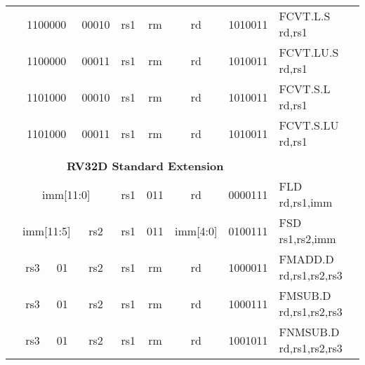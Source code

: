 \begin{table}[p]
\begin{small}
\begin{center}
\begin{tabular}{p{0in}p{0.4in}p{0.05in}p{0.05in}p{0.05in}p{0.05in}p{0.4in}p{0.6in}p{0.4in}p{0.6in}p{0.7in}l}
&
\multicolumn{4}{|c|}{1100000} &
\multicolumn{2}{c|}{00010} &
\multicolumn{1}{c|}{rs1} &
\multicolumn{1}{c|}{rm} &
\multicolumn{1}{c|}{rd} &
\multicolumn{1}{c|}{1010011} & FCVT.L.S rd,rs1 \\
\cline{2-11}
  

&
\multicolumn{4}{|c|}{1100000} &
\multicolumn{2}{c|}{00011} &
\multicolumn{1}{c|}{rs1} &
\multicolumn{1}{c|}{rm} &
\multicolumn{1}{c|}{rd} &
\multicolumn{1}{c|}{1010011} & FCVT.LU.S rd,rs1 \\
\cline{2-11}
  

&
\multicolumn{4}{|c|}{1101000} &
\multicolumn{2}{c|}{00010} &
\multicolumn{1}{c|}{rs1} &
\multicolumn{1}{c|}{rm} &
\multicolumn{1}{c|}{rd} &
\multicolumn{1}{c|}{1010011} & FCVT.S.L rd,rs1 \\
\cline{2-11}
  

&
\multicolumn{4}{|c|}{1101000} &
\multicolumn{2}{c|}{00011} &
\multicolumn{1}{c|}{rs1} &
\multicolumn{1}{c|}{rm} &
\multicolumn{1}{c|}{rd} &
\multicolumn{1}{c|}{1010011} & FCVT.S.LU rd,rs1 \\
\cline{2-11}
  

&
\multicolumn{10}{c}{} & \\
&
\multicolumn{10}{c}{\bf RV32D Standard Extension} & \\
\cline{2-11}
  

&
\multicolumn{6}{|c|}{imm[11:0]} &
\multicolumn{1}{c|}{rs1} &
\multicolumn{1}{c|}{011} &
\multicolumn{1}{c|}{rd} &
\multicolumn{1}{c|}{0000111} & FLD rd,rs1,imm \\
\cline{2-11}
  

&
\multicolumn{4}{|c|}{imm[11:5]} &
\multicolumn{2}{c|}{rs2} &
\multicolumn{1}{c|}{rs1} &
\multicolumn{1}{c|}{011} &
\multicolumn{1}{c|}{imm[4:0]} &
\multicolumn{1}{c|}{0100111} & FSD rs1,rs2,imm \\
\cline{2-11}
  

&
\multicolumn{2}{|c|}{rs3} &
\multicolumn{2}{c|}{01} &
\multicolumn{2}{c|}{rs2} &
\multicolumn{1}{c|}{rs1} &
\multicolumn{1}{c|}{rm} &
\multicolumn{1}{c|}{rd} &
\multicolumn{1}{c|}{1000011} & FMADD.D rd,rs1,rs2,rs3 \\
\cline{2-11}
  

&
\multicolumn{2}{|c|}{rs3} &
\multicolumn{2}{c|}{01} &
\multicolumn{2}{c|}{rs2} &
\multicolumn{1}{c|}{rs1} &
\multicolumn{1}{c|}{rm} &
\multicolumn{1}{c|}{rd} &
\multicolumn{1}{c|}{1000111} & FMSUB.D rd,rs1,rs2,rs3 \\
\cline{2-11}
  

&
\multicolumn{2}{|c|}{rs3} &
\multicolumn{2}{c|}{01} &
\multicolumn{2}{c|}{rs2} &
\multicolumn{1}{c|}{rs1} &
\multicolumn{1}{c|}{rm} &
\multicolumn{1}{c|}{rd} &
\multicolumn{1}{c|}{1001011} & FNMSUB.D rd,rs1,rs2,rs3 \\
\cline{2-11}
  


\end{tabular}
\end{center}
\end{small}
\end{table}
